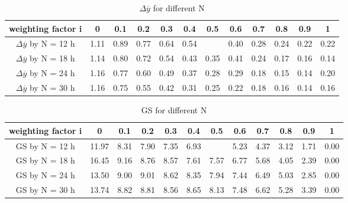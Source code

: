     \begin{table}[H]
    \centering
    \begin{tabular}{c|c|c|c|c|c|c|c|c|c|c|c}
         weighting factor i&0&0.1&0.2&0.3&0.4&0.5&0.6&0.7&0.8&0.9&1  \\
         \hline
         $\Delta \overline{y}$ by N = 12 h& 1.11 & 0.89 & 0.77 & 0.64 & 0.54 &  & 0.40 & 0.28 & 0.24 & 0.22 & 0.22\\
         $\Delta \overline{y}$ by N = 18 h& 1.14 & 0.80 & 0.72 & 0.54 & 0.43 & 0.35 & 0.41 & 0.24 & 0.17 & 0.16 & 0.14\\
         $\Delta \overline{y}$ by N = 24 h&  1.16 & 0.77 & 0.60 & 0.49 & 0.37 & 0.28 & 0.29 & 0.18 & 0.15 & 0.14 & 0.20\\
         $\Delta \overline{y}$ by N = 30 h& 1.16 & 0.75 & 0.55 & 0.42 & 0.31 & 0.25 & 0.22 & 0.18 & 0.16 & 0.14 & 0.16\\
    \end{tabular}
    \caption{$\Delta \overline{y}$ for different N}
    \label{tab:AC for different N}
    \end{table}
    
    \begin{table}[H]
    \centering
    \begin{tabular}{c|c|c|c|c|c|c|c|c|c|c|c}
         weighting factor i&0&0.1&0.2&0.3&0.4&0.5&0.6&0.7&0.8&0.9&1  \\
         \hline
         GS by N = 12 h& 11.97 & 8.31 & 7.90 & 7.35 & 6.93 &  & 5.23 & 4.37 & 3.12 & 1.71 & 0.00\\
         GS by N = 18 h & 16.45 & 9.16 & 8.76 & 8.57 & 7.61 & 7.57 & 6.77 & 5.68 & 4.05 & 2.39 & 0.00\\
         GS by N = 24 h & 13.50 & 9.00 & 9.01 & 8.62 & 8.35 & 7.94 & 7.44 & 6.49 & 5.03 & 2.85 & 0.00\\
         GS by N = 30 h & 13.74 & 8.82 & 8.81 & 8.56 & 8.65 & 8.13 & 7.48 & 6.62 & 5.28 & 3.39 & 0.00\\
    \end{tabular}
    \caption{GS for different N}
    \label{tab:GS for different N}
\end{table}
    
